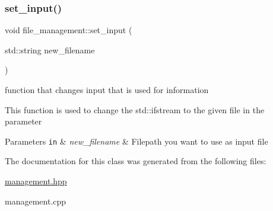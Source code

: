 \subsubsection{\texorpdfstring{set\+\_\+input()}{set\_input()}}
{\footnotesize\ttfamily void file\+\_\+management\+::set\+\_\+input (\begin{DoxyParamCaption}\item[{std\+::string}]{new\+\_\+filename }\end{DoxyParamCaption})}



function that changes input that is used for information 

This function is used to change the std\+::ifstream to the given file in the parameter


\begin{DoxyParams}[1]{Parameters}
\mbox{\tt in}  & {\em new\+\_\+filename} & Filepath you want to use as input file \\
\hline
\end{DoxyParams}


The documentation for this class was generated from the following files\+:\begin{DoxyCompactItemize}
\item 
\hyperlink{management_8hpp}{management.\+hpp}\item 
management.\+cpp\end{DoxyCompactItemize}
